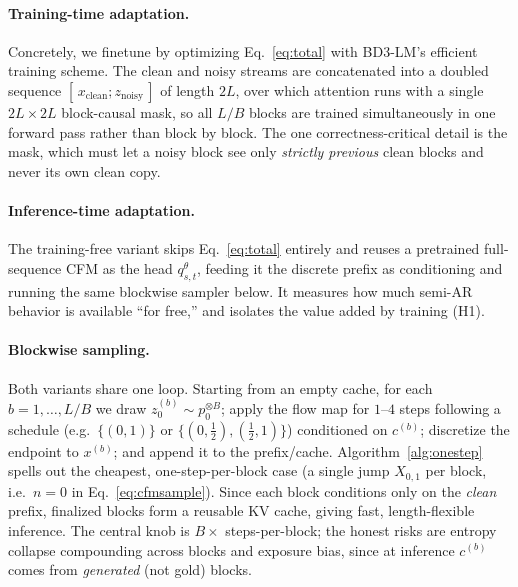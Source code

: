 \documentclass[twocolumn]{style}
\begin{document}
\paragraph{Training-time adaptation.} Concretely, we finetune by optimizing Eq.~\eqref{eq:total} with BD3-LM's efficient training scheme. The clean and noisy streams are concatenated into a doubled sequence $[\,x_\text{clean};z_\text{noisy}\,]$ of length $2L$, over which attention runs with a single $2L\times 2L$ block-causal mask, so all $L/B$ blocks are trained simultaneously in one forward pass rather than block by block. The one correctness-critical detail is the mask, which must let a noisy block see only \emph{strictly previous} clean blocks and never its own clean copy.

\paragraph{Inference-time adaptation.} The training-free variant skips Eq.~\eqref{eq:total} entirely and reuses a pretrained full-sequence CFM as the head $q^\theta_{s,t}$, feeding it the discrete prefix as conditioning and running the same blockwise sampler below. It measures how much semi-AR behavior is available ``for free,'' and isolates the value added by training (H1).

\paragraph{Blockwise sampling.} Both variants share one loop. Starting from an empty cache, for each $b=1,\dots,L/B$ we draw $z_0^{(b)}\sim p_0^{\otimes B}$; apply the flow map for $1$--$4$ steps following a schedule (e.g.\ $\{(0,1)\}$ or $\{(0,\tfrac12),(\tfrac12,1)\}$) conditioned on $c^{(b)}$; discretize the endpoint to $x^{(b)}$; and append it to the prefix/cache. Algorithm~\ref{alg:onestep} spells out the cheapest, one-step-per-block case (a single jump $X_{0,1}$ per block, i.e.\ $n=0$ in Eq.~\eqref{eq:cfmsample}). Since each block conditions only on the \emph{clean} prefix, finalized blocks form a reusable KV cache, giving fast, length-flexible inference. The central knob is $B\times$ steps-per-block; the honest risks are entropy collapse compounding across blocks and exposure bias, since at inference $c^{(b)}$ comes from \emph{generated} (not gold) blocks.
\end{document}
